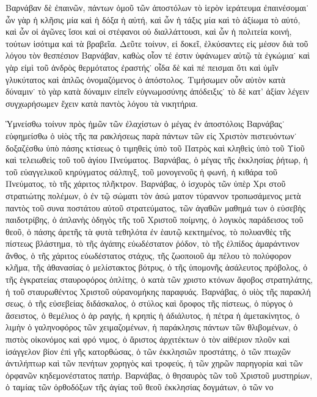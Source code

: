 Βαρνάβαν δὲ ἐπαινῶν, πάντων ὁμοῦ τῶν ἀποστόλων
τὸ ἱερὸν ἱεράτευμα ἐπαινέσομαι˙ ὧν γὰρ ἡ κλῆσις μία
καὶ ἡ δόξα ἡ αὐτή, καὶ ὧν ἡ τάξις μία καὶ τὸ ἀξίωμα
τὸ αὐτό, καὶ ὧν οἱ ἀγῶνες ἴσοι καὶ οἱ στέφανοι οὐ
διαλλάττουσι, καὶ ὧν ἡ πολιτεία κοινή, τούτων ἰσότιμα
καὶ τὰ βραβεῖα. Δεῦτε τοίνυν, εἰ δοκεῖ, ἑλκύσαντες εἰς
μέσον διὰ τοῦ λόγου τὸν θεσπέσιον Βαρνάβαν, καθὼς
οἷον τέ ἐστιν ὑφάνωμεν αὐτῷ τὰ ἐγκώμια˙ καὶ γὰρ
εἰμὶ τοῦ ἀνδρὸς θερμότατος ἐραστής˙ οἶδα δὲ καὶ πέ%
πεισμαι ὅτι καὶ ὑμῖν γλυκύτατος καὶ ἁπλῶς ὀνομαζόμενος
ὁ ἀπόστολος. Τιμήσωμεν οὖν αὐτὸν κατὰ δύναμιν˙ τὸ
γὰρ κατὰ δύναμιν εἰπεῖν εὐγνωμοσύνης ἀπόδειξις˙ τὸ
δὲ κατ’ ἀξίαν λέγειν συγχωρήσωμεν ἔχειν κατὰ παντὸς
λόγου τὰ νικητήρια.

\saut

  Ὑμνείσθω τοίνυν πρὸς ἡμῶν τῶν ἐλαχίστων ὁ μέγας
ἐν ἀποστόλοις Βαρνάβας˙ εὐφημείσθω ὁ υἱὸς τῆς πα%
ρακλήσεως παρὰ πάντων τῶν εἰς Χριστὸν πιστευόντων˙
δοξαζέσθω ὑπὸ πάσης κτίσεως ὁ τιμηθεὶς ὑπὸ τοῦ
Πατρὸς καὶ κληθεὶς ὑπὸ τοῦ Υἱοῦ καὶ τελειωθεὶς τοῦ
τοῦ ἁγίου Πνεύματος. Βαρνάβας, ὁ μέγας τῆς ἐκκλησίας
ῥήτωρ, ἡ τοῦ εὐαγγελικοῦ κηρύγματος σάλπιγξ, τοῦ
μονογενοῦς ἡ φωνή, ἡ κιθάρα τοῦ Πνεύματος, τὸ τῆς
χάριτος πλῆκτρον. Βαρνάβας, ὁ ἰσχυρὸς τῶν ὑπὲρ Χρι%
στοῦ στρατιώτης πολέμων, ὁ ἐν τῷ σώματι τὸν ἀσώ
ματον τύραννον τροπωσάμενος μετὰ παντὸς τοῦ συνα%
ποστάτου αὐτοῦ στρατεύματος, τῶν ἀγαθῶν μαθημά%
των ὁ εὐσεβὴς παιδοτρίβης, ὁ ἀπλανὴς ὁδηγὸς τῆς
τοῦ Χριστοῦ ποίμνης, ὁ λογικὸς παράδεισος τοῦ θεοῦ,
ὁ πάσης ἀρετῆς τὰ φυτὰ τεθηλότα ἐν ἑαυτῷ κεκτημένος,
τὸ πολυανθὲς τῆς πίστεως βλάστημα, τὸ τῆς ἀγάπης
εὐωδέστατον ῥόδον, τὸ τῆς ἐλπίδος ἀμαράντινον ἄνθος,
ὁ τῆς χάριτος εὐωδέστατος στάχυς, τῆς ζωοποιοῦ ἀμ%
πέλου τὸ πολύφορον κλῆμα, τῆς ἀθανασίας ὁ μελίστακτος
βότρυς, ὁ τῆς ὑπομονῆς ἀσάλευτος πρόβολος, ὁ τῆς
ἐγκρατείας σταυροφόρος ὁπλίτης, ὁ κατὰ τῶν χριστο%
κτόνων ἄφοβος στρατηλάτης, ἡ τοῦ σταυρωθέντος Χριστοῦ
οὐρανομήκης παραφυάς. Βαρνάβας, ὁ υἱὸς τῆς παρακλή%
σεως, ὁ τῆς εὐσεβείας διδάσκαλος, ὁ στύλος καὶ ὄροφος
τῆς πίστεως, ὁ πύργος ὁ ἄσειστος, ὁ θεμέλιος ὁ ἀρ
ραγής, ἡ κρηπὶς ἡ ἀδιάλυτος, ἡ πέτρα ἡ ἀμετακίνητος,
ὁ λιμὴν ὁ γαληνοφόρος τῶν χειμαζομένων, ἡ παράκλησις
πάντων τῶν θλιβομένων, ὁ πιστὸς οἰκονόμος καὶ φρό%
νιμος, ὁ ἄριστος ἀρχιτέκτων ὁ τὸν αἰθέριον πλοῦν καὶ
ἰσάγγελον βίον ἐπὶ γῆς κατορθώσας, ὁ τῶν ἐκκλησιῶν
προστάτης, ὁ τῶν πτωχῶν ἀντιλήπτωρ καὶ τῶν πενήτων
χορηγὸς καὶ τροφεύς, ἡ τῶν χηρῶν παρηγορία καὶ τῶν
ὀρφανῶν κηδεμονέστατος πατήρ. Βαρνάβας, ὁ θησαυρὸς
τῶν τοῦ Χριστοῦ μυστηρίων, ὁ ταμίας τῶν ὀρθοδόξων
τῆς ἁγίας τοῦ θεοῦ ἐκκλησίας δογμάτων, ὁ τῶν νο
